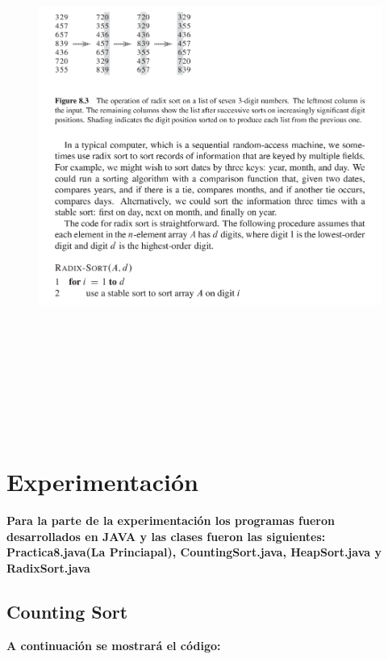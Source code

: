 \documentclass[a4paper]{article} %
\begin{document}
		\begin{figure}[ht]
			\begin{center}
				\includegraphics[width=\textwidth,height=180mm]{Imagenes/radixsort/radix02.png}				
			\end{center} 
		\end{figure}
		\afterpage{\newpage}
		\newpage
			
			
	\section*{Experimentación}
		\textbf{Para la parte de la experimentación los programas fueron desarrollados en JAVA y las clases fueron las siguientes: Practica8.java(La Princiapal), CountingSort.java, HeapSort.java y RadixSort.java}\\
		\subsection*{Counting Sort}
			\textbf{ A continuación se mostrará el código:}
			
			\afterpage{\newpage}
			\newpage			
\end{document}
